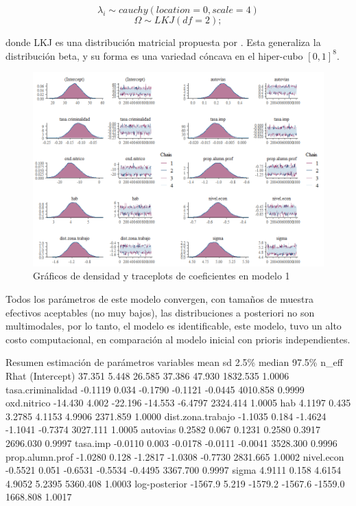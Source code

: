 \documentclass[nojss]{jss}
\begin{document}
$$\lambda_i \sim cauchy(location = 0,scale = 4)$$ 
$$\Omega \sim LKJ(df = 2);$$

donde LKJ es una distribución matricial propuesta por \cite{LKJ2009}. Esta generaliza la distribución beta, y su forma es una variedad cóncava en el hiper-cubo $[0,1]^8$.


\begin{figure}[H]
	\centering
	\includegraphics[scale=0.8]{images/traceplot2}
	\caption[trace1]{Gráficos de densidad y traceplots de coeficientes en modelo 1}
	\label{fig:fig7}
\end{figure}

Todos los parámetros de este modelo convergen, con tamaños de muestra efectivos aceptables (no muy bajos), las distribuciones a posteriori no son multimodales, por lo tanto, el modelo es identificable, este modelo, tuvo un alto costo computacional, en comparación al modelo inicial con prioris independientes. 

\begin{CodeChunk}	
\begin{CodeOutput}
	                Resumen estimación de parámetros
variables            mean  sd     2.5\%  median   97.5\%   n_eff    Rhat
(Intercept)        37.351 5.448  26.585  37.386  47.930 1832.535  1.0006
tasa.criminalidad -0.1119 0.034 -0.1790 -0.1121 -0.0445 4010.858  0.9999
oxd.nitrico       -14.430 4.002 -22.196 -14.553 -6.4797 2324.414  1.0005
hab                4.1197 0.435  3.2785  4.1153  4.9906 2371.859  1.0000
dist.zona.trabajo -1.1035 0.184 -1.4624 -1.1041 -0.7374 3027.111  1.0005
autovias           0.2582 0.067  0.1231  0.2580  0.3917 2696.030  0.9997
tasa.imp          -0.0110 0.003 -0.0178 -0.0111 -0.0041 3528.300  0.9996
prop.alumn.prof   -1.0280 0.128 -1.2817 -1.0308 -0.7730 2831.665  1.0002
nivel.econ        -0.5521 0.051 -0.6531 -0.5534 -0.4495 3367.700  0.9997
sigma              4.9111 0.158  4.6154  4.9052  5.2395 5360.408  1.0003
log-posterior     -1567.9 5.219 -1579.2 -1567.6 -1559.0 1668.808  1.0017 
\end{CodeOutput}
\end{CodeChunk}
\end{document}
